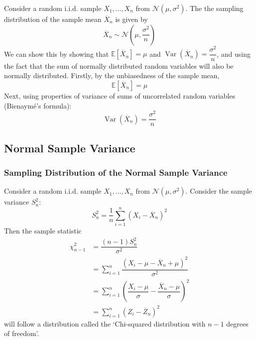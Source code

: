 \documentclass[11pt]{report} %
\begin{document}
Consider a random i.i.d. sample $X_{1}, \dots, X_{n}$ from $\mathcal{N}\left(\mu, \sigma^{2}\right)$. The the sampling distribution of the sample mean $\overline{X}_{n}$ is given by
\begin{equation}
\overline{X}_{n} \sim \mathcal{N}\left(\mu, \dfrac{\sigma^{2}}{n}\right)
\end{equation}
We can show this by showing that $\mathbb{E}\left[\overline{X}_{n}\right]= \mu$ and $\operatorname{Var}\left(\overline{X}_{n}\right) = \dfrac{\sigma^{2}}{n}$, and using the fact that the sum of normally distributed random variables will also be normally distributed. Firstly, by the unbiasedness of the sample mean,
\begin{equation}
\mathbb{E}\left[\overline{X}_{n}\right] = \mu
\end{equation}
Next, using properties of variance of sums of uncorrelated random variables (Bienaym\'{e}'s formula):
\begin{equation}
\operatorname{Var}\left(\overline{X}_{n}\right) = \dfrac{\sigma^{2}}{n}
\end{equation}

\subsection{Normal Sample Variance}

\subsubsection{Sampling Distribution of the Normal Sample Variance}

Consider a random i.i.d. sample $X_{1}, \dots, X_{n}$ from $\mathcal{N}\left(\mu, \sigma^{2}\right)$. Consider the sample variance $S_{n}^{2}$:
\begin{equation}
S_{n}^{2} = \dfrac{1}{n}\sum_{i = 1}^{n}\left(X_{i} - \overline{X}_{n}\right)^{2}
\end{equation}
Then the sample statistic
\begin{align}
\chi_{n - 1}^{2} &= \dfrac{\left(n - 1\right)S_{n}^{2}}{\sigma^{2}} \\
&= \sum_{i = 1}^{n}\dfrac{\left(X_{i} - \mu - \overline{X}_{n} + \mu\right)^{2}}{\sigma^{2}} \\
&= \sum_{i = 1}^{n}\left(\dfrac{X_{i} - \mu}{\sigma} - \dfrac{\overline{X}_{n} - \mu}{\sigma}\right)^{2} \\
&= \sum_{i = 1}^{n}\left(Z_{i} - \overline{Z}_{n}\right)^{2}
\end{align}
will follow a distribution called the `Chi-squared distribution with $n - 1$ degrees of freedom'.
\end{document}
